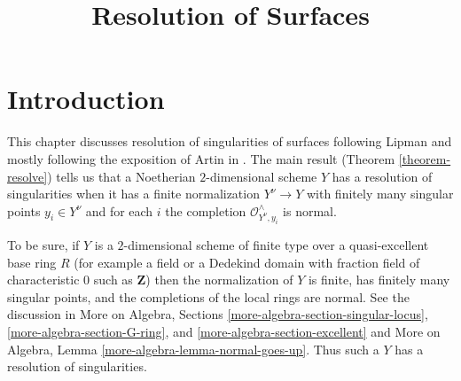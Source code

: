 

%


\title{Resolution of Surfaces}


\maketitle

\label{section-phantom}

\tableofcontents

\section{Introduction}
\label{section-introduction}

\noindent
This chapter discusses resolution of singularities of surfaces
following Lipman \cite{Lipman} and mostly following the exposition of
Artin in \cite{Artin-Lipman}. The main result
(Theorem \ref{theorem-resolve}) tells us that a Noetherian
$2$-dimensional scheme $Y$ has a resolution of singularities when
it has a finite normalization $Y^\nu \to Y$ with
finitely many singular points $y_i \in Y^\nu$ and for each $i$ the completion
$\mathcal{O}_{Y^\nu, y_i}^\wedge$ is normal.

\medskip\noindent
To be sure, if $Y$ is a $2$-dimensional scheme of finite type over
a quasi-excellent base ring $R$ (for example a field or a
Dedekind domain with fraction field of characteristic $0$
such as $\mathbf{Z}$) then the normalization of $Y$ is finite,
has finitely many singular points, and the completions of the
local rings are normal. See the discussion in
More on Algebra, Sections
\ref{more-algebra-section-singular-locus},
\ref{more-algebra-section-G-ring}, and
\ref{more-algebra-section-excellent}
and
More on Algebra, Lemma \ref{more-algebra-lemma-normal-goes-up}.
Thus such a $Y$ has a resolution of singularities.

